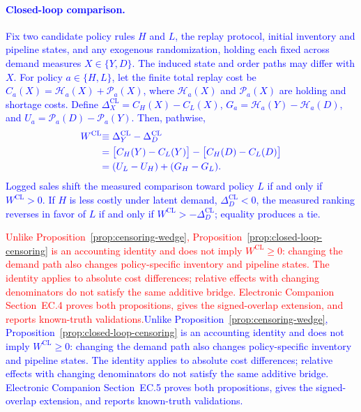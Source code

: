 \documentclass[msom,dblanonrev]{informs4}
\newcommand{\add}[1]{\textcolor{blue}{#1}}
\newcommand{\reduce}[1]{\textcolor{red}{#1}\hspace{0.5em}}
\begin{document}
\paragraph{\add{Closed-loop comparison.}}
\begin{proposition}[\add{Closed-loop policy-dependent censoring bridge}]\label{prop:closed-loop-censoring}
\add{Fix two candidate policy rules $H$ and $L$, the replay protocol, initial inventory and pipeline states, and any exogenous randomization, holding each fixed across demand measures $X\in\{Y,D\}$. The induced state and order paths may differ with $X$. For policy $a\in\{H,L\}$, let the finite total replay cost be $C_a(X)=\mathcal H_a(X)+\mathcal P_a(X)$, where $\mathcal H_a(X)$ and $\mathcal P_a(X)$ are holding and shortage costs. Define $\Delta_X^{\mathrm{CL}}=C_H(X)-C_L(X)$, $G_a=\mathcal H_a(Y)-\mathcal H_a(D)$, and $U_a=\mathcal P_a(D)-\mathcal P_a(Y)$. Then, pathwise,}
\begin{equation}\label{eq:closed-loop-censoring-condition}
\begin{aligned}
\add{W^{\mathrm{CL}}}
&\add{\equiv\Delta_Y^{\mathrm{CL}}-\Delta_D^{\mathrm{CL}}}\\
&\add{=\bigl[C_H(Y)-C_L(Y)\bigr]-\bigl[C_H(D)-C_L(D)\bigr]}\\
&\add{=(U_L-U_H)+(G_H-G_L).}
\end{aligned}
\end{equation}
\add{Logged sales shift the measured comparison toward policy $L$ if and only if $W^{\mathrm{CL}}>0$. If $H$ is less costly under latent demand, $\Delta_D^{\mathrm{CL}}<0$, the measured ranking reverses in favor of $L$ if and only if $W^{\mathrm{CL}}> -\Delta_D^{\mathrm{CL}}$; equality produces a tie.}
\end{proposition}

\reduce{Unlike Proposition~\ref{prop:censoring-wedge}, Proposition~\ref{prop:closed-loop-censoring} is an accounting identity and does not imply $W^{\mathrm{CL}}\geq0$: changing the demand path also changes policy-specific inventory and pipeline states. The identity applies to absolute cost differences; relative effects with changing denominators do not satisfy the same additive bridge. Electronic Companion Section~EC.4 proves both propositions, gives the signed-overlap extension, and reports known-truth validations.}\add{Unlike Proposition~\ref{prop:censoring-wedge}, Proposition~\ref{prop:closed-loop-censoring} is an accounting identity and does not imply $W^{\mathrm{CL}}\geq0$: changing the demand path also changes policy-specific inventory and pipeline states. The identity applies to absolute cost differences; relative effects with changing denominators do not satisfy the same additive bridge. Electronic Companion Section~EC.5 proves both propositions, gives the signed-overlap extension, and reports known-truth validations.}
\end{document}
